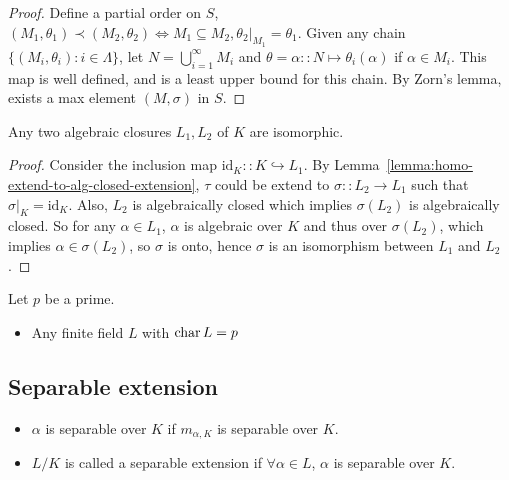 \begin{theorem}
\begin{lemma}
\begin{proof}
      Define a partial order on $S$, $(M_1, \theta_1) \prec (M_2, \theta_2) \iff M_1 \subseteq M_2, \theta_2 \big|_{M_1} = \theta_1$.
      Given any chain $\{(M_i, \theta_i) : i \in \Lambda \}$, let $N = \bigcup_{i = 1}^\infty M_i$ and
      $\theta = \alpha :: N \mapsto \theta_i(\alpha)$ if $\alpha \in M_i$. This map is well defined, and is
      a  least upper bound for this chain. By Zorn's lemma, exists a max element $(M, \sigma)$ in $S$.
    \end{proof}
  \end{lemma}

  \begin{theorem}
    Any two algebraic closures $L_1, L_2$ of $K$ are isomorphic.
    \begin{proof}
      Consider the inclusion map $\text{id}_K :: K \hookrightarrow L_1$.
      By Lemma~\ref{lemma:homo-extend-to-alg-closed-extension},
      $\tau$ could be extend to $\sigma :: L_2 \to L_1$ such that $\sigma\big|_K = \text{id}_K$.
      Also, $L_2$ is algebraically closed which implies $\sigma(L_2)$ is algebraically closed.
      So for any $\alpha \in L_1$, $\alpha$ is algebraic over $K$ and thus over $\sigma(L_2)$,
      which implies $\alpha \in \sigma(L_2)$, so $\sigma$ is onto, hence $\sigma$ is an
      isomorphism between $L_1$ and $L_2$.
    \end{proof}
  \end{theorem}

  \begin{example}
    Let $p$ be a prime.
    \begin{itemize}
      \item Any finite field $L$ with $\operatorname{char} L = p$
    \end{itemize}
  \end{example}
\end{theorem}

\subsection{Separable extension}

\begin{definition} \hfill
  \begin{itemize}
    \item $\alpha$ is separable over $K$ if $m_{\alpha, K}$ is separable over $K$.
    \item $L/K$ is called a separable extension if $\forall \alpha \in L$, $\alpha$ is separable over $K$.
  \end{itemize}
\end{definition}

